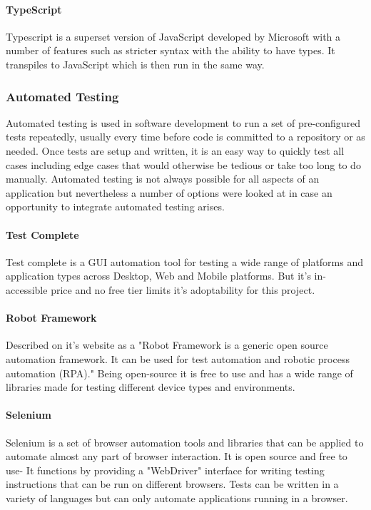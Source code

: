 \paragraph{TypeScript}
Typescript is a superset version of JavaScript developed by Microsoft with a number of features such as stricter syntax with the ability to have types. It transpiles to JavaScript which is then run in the same way. \cite[]{microsoft_typescript}

\subsubsection{Automated Testing}
Automated testing is used in software development to run a set of pre-configured tests repeatedly, usually every time before code is committed to a repository or as needed. Once tests are setup and written, it is an easy way to quickly test all cases including edge cases that would otherwise be tedious or take too long to do manually. Automated testing is not always possible for all aspects of an application but nevertheless a number of options were looked at in case an opportunity to integrate automated testing arises.

\paragraph{Test Complete}
Test complete is a GUI automation tool for testing a wide range of platforms and application types across Desktop, Web and Mobile platforms. \cite[]{smartbear_testcomplete}
But it's in-accessible price and no free tier limits it's adoptability for this project. \cite[]{smartbear_pricing}

\paragraph{Robot Framework}
Described on it's website as a "Robot Framework is a generic open source automation framework. It can be used for test automation and robotic process automation (RPA)." \cite[]{robotframework_robot} Being open-source it is free to use and has a wide range of libraries made for testing different device types and environments. \cite[]{robotframework_robot}

\paragraph{Selenium}
Selenium is a set of browser automation tools and libraries that can be applied to automate almost any part of browser interaction.
It is open source and free to use- It functions by providing a "WebDriver" interface for writing testing instructions that can be run on different browsers. Tests can be written
in a variety of languages but can only automate applications running in a browser. \cite[]{selenium_the}

